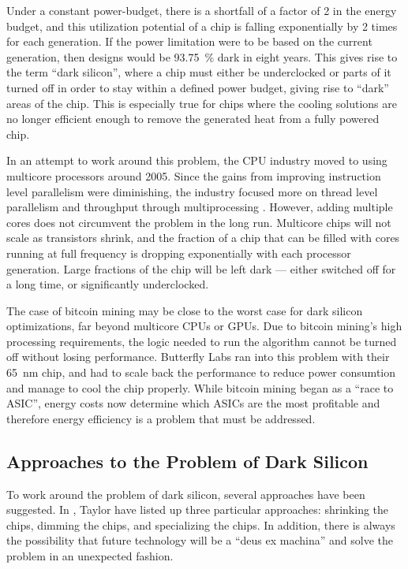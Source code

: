 Under a constant power-budget, there is a shortfall of a factor of 2 in the energy budget,
and this utilization potential of a chip is falling exponentially by 2 times for each generation.
If the power limitation were to be based on the current generation, then designs would be 93.75~\% dark in eight years.
This gives rise to the term ``dark silicon'', where a chip must either be underclocked or parts of
it turned off in order to stay within a defined power budget, giving rise to ``dark'' areas of the chip.
This is especially true for chips where the cooling solutions are no longer efficient enough to remove
the generated heat from a fully powered chip.

In an attempt to work around this problem, the CPU industry moved to using multicore processors around 2005.
Since the gains from improving instruction level parallelism were diminishing, the industry focused more on thread level parallelism and throughput through multiprocessing \cite{computer-architecture}.
However, adding multiple cores does not circumvent the problem in the long run.
Multicore chips will not scale as transistors shrink, and the fraction of a chip that can be filled with cores running at full frequency is dropping exponentially with each processor generation. 
Large fractions of the chip will be left dark --- either switched off for a long time, or significantly underclocked. \cite{dark-silicon}

The case of bitcoin mining may be close to the worst case for dark silicon optimizations, far beyond multicore CPUs or GPUs. 
Due to bitcoin mining's high processing requirements, the logic needed to run the algorithm cannot be turned off without losing performance.
Butterfly Labs ran into this problem with their 65~nm chip, and had to scale back the performance to reduce power consumtion and manage to cool the chip properly. While bitcoin mining began as a ``race to ASIC'', energy costs now determine which ASICs are the most profitable and therefore energy efficiency is a problem that must be addressed. \cite{bespoke-silicon}

\subsection{Approaches to the Problem of Dark Silicon}
\label{sec:taylor}

To work around the problem of dark silicon, several approaches have been suggested.
In \cite{dark-silicon}, Taylor have listed up three particular approaches: shrinking the chips, dimming the chips, and specializing the chips.
In addition, there is always the possibility that future technology will be a ``deus ex machina'' and solve the problem in
an unexpected fashion.

